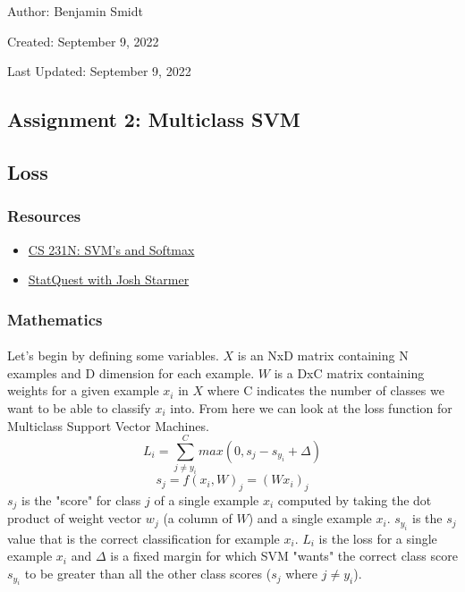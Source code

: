 \documentclass[12pt]{article}
\begin{document}
\noindent Author: Benjamin Smidt

\noindent Created: September 9, 2022

\noindent Last Updated: September 9, 2022
\begin{center}
\section*{Assignment 2: Multiclass SVM}
\end{center}

\subsection*{Loss}

\subsubsection{Resources}
\begin{itemize}
    \item \href{https://cs231n.github.io/linear-classify/#svm-vs-softmax}{CS 231N: SVM's and Softmax }
    \item \href{https://www.youtube.com/watch?v=efR1C6CvhmE}{StatQuest with Josh Starmer}
\end{itemize}

\subsubsection{Mathematics}

\paragraph{}
Let's begin by defining some variables. $X$ is an NxD matrix containing 
N examples and D dimension for each example. $W$ is a DxC matrix containing 
weights for a given example $x_i$ in $X$ where C indicates the number of 
classes we want to be able to classify $x_i$ into. From here we can look
at the loss function for Multiclass Support Vector Machines.
\begin{equation}
    L_{i} = \sum_{j \neq y_{i}}^C max(0, s_{j} - s_{y_{i}} + \Delta)
\end{equation}
\begin{equation}
    s_{j} = f(x_{i}, W)_{j} = (Wx_i)_j
\end{equation}
$s_j$ is the "score" for class $j$ of a single example $x_i$
computed by taking the dot product of weight vector $w_j$ 
(a column of $W$) and a single example $x_i$. $s_{y_{i}}$ is the $s_j$ value
that is the correct classification for example $x_i$. 
$L_i$ is the loss for a single example $x_i$ and $\Delta$ 
is a fixed margin for which SVM "wants" the correct class score 
$s_{y_i}$ to be greater than all the other class scores ($s_j$ where $j \neq y_i$). 
\end{document}
